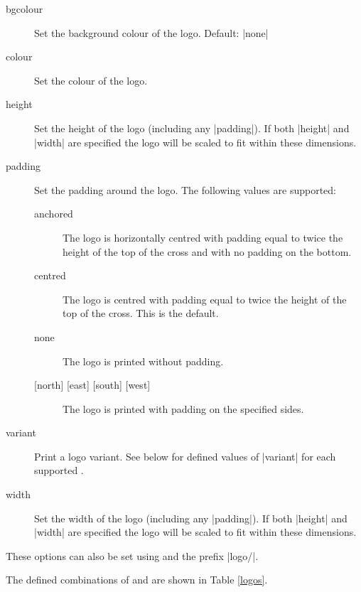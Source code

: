 \documentclass[a4paper]{l3doc}
\begin{document}
\begin{description}
  \item[bgcolour] Set the background colour of the logo. Default: |none|
  \item[colour] Set the colour of the logo.
  \item[height] Set the height of the logo (including any |padding|). If both
    |height| and |width| are specified the logo will be scaled to fit within
    these dimensions.
  \item[padding] Set the padding around the logo. The following values are
    supported:
    \begin{description}
      \item[anchored] The logo is horizontally centred with padding equal to
        twice the height of the top of the cross and with no padding on the
        bottom.


      \item[centred] The logo is centred with padding equal to twice the
        height of the top of the cross. This is the default.


      \item[none] The logo is printed without padding.


      \item[{[north] [east] [south] [west]}] The logo is printed with padding
        on the specified sides.
    \end{description}
  \item[variant] Print a logo variant. See below for defined values of
    |variant| for each supported .
  \item[width] Set the width of the logo (including any |padding|). If both
    |height| and |width| are specified the logo will be scaled to fit within
    these dimensions.
\end{description}

These options can also be set using  and the prefix
|logo/|.

The defined combinations of  and  are shown in Table
\ref{logos}.
\end{document}
